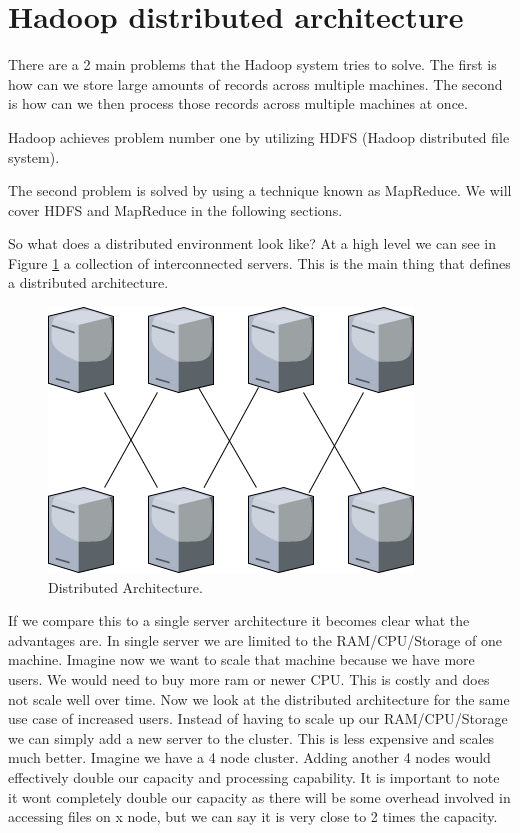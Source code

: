\section{Hadoop distributed architecture}

There are a 2 main problems that the Hadoop system tries to solve. 
The first is how can we store large amounts of records across multiple machines.
The second is how can we then process those records across multiple machines at once.

Hadoop achieves problem number one by utilizing HDFS (Hadoop distributed file system). 

The second problem is solved by using a technique known as MapReduce.
We will cover HDFS and MapReduce in the following sections. 

So what does a distributed environment look like? At a high level we can see in Figure \ref{fig:distributed} a collection of interconnected servers. This is the main thing that defines a distributed architecture. 

\begin{figure}[H]
  \includegraphics[width=\linewidth]{./images/distributed.png}
  \caption{Distributed Architecture.}
  \label{fig:distributed}
\end{figure}

If we compare this to a single server architecture it becomes clear what the advantages are. In single server we are limited to the RAM/CPU/Storage of one machine. Imagine now we want to scale that machine because we have more users. We would need to buy more ram or newer CPU. This is costly and does not scale well over time. Now we look at the distributed architecture for the same use case of increased users. Instead of having to scale up our RAM/CPU/Storage we can simply add a new server to the cluster. This is less expensive and scales much better. Imagine we have a 4 node cluster. Adding another 4 nodes would effectively double our capacity and processing capability. It is important to note it wont completely double our capacity as there will be some overhead involved in accessing files on x node, but we can say it is very close to 2 times the capacity.
